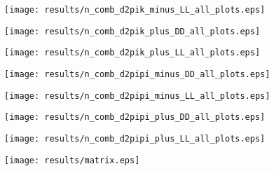 \documentclass[11pt,a4paper]{article}
\begin{document}
\texttt{[image: results/n\_comb\_d2pik\_minus\_LL\_all\_plots.eps]}

\texttt{[image: results/n\_comb\_d2pik\_plus\_DD\_all\_plots.eps]}

\texttt{[image: results/n\_comb\_d2pik\_plus\_LL\_all\_plots.eps]}

\texttt{[image: results/n\_comb\_d2pipi\_minus\_DD\_all\_plots.eps]}

\texttt{[image: results/n\_comb\_d2pipi\_minus\_LL\_all\_plots.eps]}

\texttt{[image: results/n\_comb\_d2pipi\_plus\_DD\_all\_plots.eps]}

\texttt{[image: results/n\_comb\_d2pipi\_plus\_LL\_all\_plots.eps]}


\clearpage
\texttt{[image: results/matrix.eps]}
\end{document}
